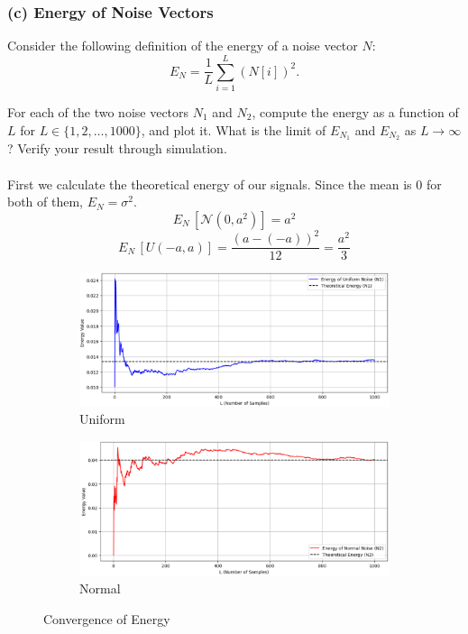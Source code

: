 \documentclass[hidelinks,12pt]{article}
\begin{document}
	
	
	\subsubsection*{(c) Energy of Noise Vectors}
	Consider the following definition of the energy of a noise vector $N$:
	\[ E_N = \frac{1}{L} \sum_{i=1}^L \left(N[i]\right)^2. \tag{6} \]
	
	 For each of the two noise vectors $N_1$ and $N_2$, compute the energy as a function of $L$ for $L \in \{1, 2, \dots, 1000\}$, and plot it. What is the limit of $E_{N_1}$ and $E_{N_2}$ as $L \to \infty$? Verify your result through simulation.
	\\ \\
	First we calculate the theoretical energy of our signals. Since the mean is 0 for both of them, $E_N = \sigma^2$.
	\\
	$$
	E_N \, [\mathcal{N}(0,a^2)] = a^2
	$$
	$$
	E_N \, [U(-a,a)] = \frac{(a-(-a))^2}{12} = \frac{a^2}{3}
	$$
	
	\pagebreak
	
	\begin{figure}[h!]
		\centering
		\begin{subfigure}[b]{0.45\textwidth}
			\centering
			\includegraphics[width=\textwidth]{figures/uniform_energy.PNG}
			\caption{Uniform}
		\end{subfigure}
		\hspace{0.5cm}
		\begin{subfigure}[b]{0.45\textwidth}
			\centering
			\includegraphics[width=\textwidth]{figures/normal_energy.PNG}
			\caption{Normal}
		\end{subfigure}
		\caption{Convergence of Energy}
	\end{figure}
	
\end{document}
